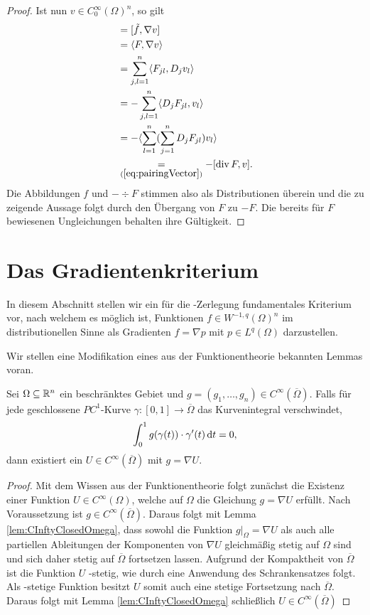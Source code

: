 \begin{proof}
  Ist nun $v \in C_0^\infty(\Omega)^n$, so gilt
  \begin{align*}
    [f,v]
    &= [\tilde f, \nabla v] \\
    &= \langle F, \nabla v\rangle \\
    &= \sum_{j,l=1}^n \langle F_{jl}, D_j v_l \rangle \\
    &= -\sum_{j,l=1}^n \langle D_j F_{jl}, v_l \rangle \\
    &= - \langle \sum_{l = 1}^n ( \sum_{j = 1}^n D_j F_{jl} ) v_l \rangle \\
    &\underset{(\ref{eq:pairingVector})}{=} -[\div F, v]. \\
  \end{align*}
  Die Abbildungen $f$ und $-\div F$ stimmen also als Distributionen überein und die zu zeigende Aussage folgt durch den Übergang von $F$ zu $-F$.
  Die bereits für $F$ bewiesenen Ungleichungen behalten ihre Gültigkeit.
\end{proof}

\section{Das Gradientenkriterium}

In diesem Abschnitt stellen wir ein für die \helmholtz\hyp{}Zerlegung fundamentales Kriterium vor, nach welchem es möglich ist, Funktionen $f \in W^{-1,q}(\Omega)^n$ im distributionellen Sinne als Gradienten $f = \nabla p$ mit $p \in L^q(\Omega)$ darzustellen.

Wir stellen eine Modifikation eines aus der Funktionentheorie bekannten Lemmas voran.

\begin{lem}
  \label{lem:existencePotential}
  Sei $\Omega \subseteq \mathbb{R}^n$ ein beschränktes Gebiet und $g = (g_1, \dots, g_n) \in C^\infty(\overline\Omega)$.
  Falls für jede geschlossene $PC^1$-Kurve $\gamma \colon [0,1] \to \overline\Omega$ das Kurvenintegral verschwindet,
$$
  \int_0^1 g(\gamma(t)) \cdot \gamma'(t) \, {\operatorname{d}\!{t}} = 0,  
$$
  dann existiert ein $U\in C^\infty(\overline\Omega)$ mit $g = \nabla U$.
\end{lem}

\begin{proof}
  Mit dem Wissen aus der Funktionentheorie folgt zunächst die Existenz einer Funktion $U \in C^\infty(\Omega)$, welche auf $\Omega$ die Gleichung $g = \nabla U$ erfüllt.
  Nach Voraussetzung ist $g \in C^\infty(\overline\Omega)$.
  Daraus folgt mit Lemma \ref{lem:CInftyClosedOmega}, dass sowohl die Funktion $g|_\Omega = \nabla U$ als auch alle partiellen Ableitungen der Komponenten von $\nabla U$ gleichmäßig stetig auf $\Omega$ sind und sich daher stetig auf $\overline\Omega$ fortsetzen lassen.
  Aufgrund der Kompaktheit von $\overline\Omega$ ist die Funktion $U$ \lipschitz\hyp{}stetig, wie durch eine Anwendung des Schrankensatzes folgt.
  Als \lipschitz\hyp{}stetige Funktion besitzt $U$ somit auch eine stetige Fortsetzung nach $\overline\Omega$.
  Daraus folgt mit Lemma \ref{lem:CInftyClosedOmega} schließlich $U \in C^\infty(\overline\Omega)$ 
\end{proof}

